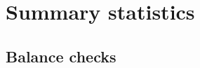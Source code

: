 \documentclass[11pt]{article}
\begin{document}
	\clearpage

%
%
%
%

\section{Summary statistics}

	\subsection{Balance checks}
\end{document}
